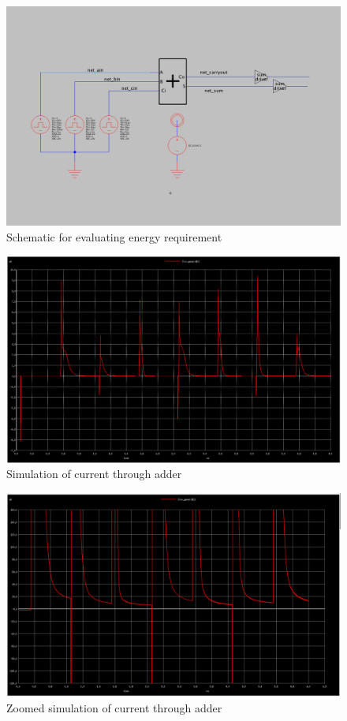\documentclass{article}
\begin{document}
\begin{figure}[H]
  \includegraphics[width=\linewidth]{baseline_screenshots/baseline_test_power_sch.png}
  \caption{Schematic for evaluating energy requirement}
  \label{fig:baseline_energy_sch}
\end{figure}
\begin{figure}[H]
  \includegraphics[width=\linewidth]{baseline_screenshots/baseline_leakage_energy.png}
  \caption{Simulation of current through adder}
  \label{fig:baseline_leakage_energy}
\end{figure}
\begin{figure}[H]
  \includegraphics[width=\linewidth]{baseline_screenshots/baseline_leakage_energy_zoom.png}
  \caption{Zoomed simulation of current through adder}
  \label{fig:baseline_leakage_energy_zoom}
\end{figure}
\end{document}
